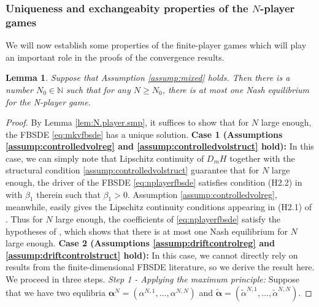 \documentclass[11pt,reqno]{amsart}
\numberwithin{equation}{section}
\newtheorem{lemma}[theorem]{Lemma}
\theoremstyle{definition}
\def\N{{\mathbb N}}
\newcommand{\wt}{\widetilde}
\def \N{\mathbb{N}}
\begin{document}
\subsubsection{Uniqueness and exchangeabity properties of the $N$-player games}


We will now establish some properties of the finite-player games which will play an important role in the proofs of the convergence results.




\begin{lemma} \label{lem:uniqueness}
Suppose that Assumption \ref{assump:mixed} holds.
Then there is a number $N_0 \in \N$ such that for any $N \geq N_0$, there is at most one Nash equilibrium for the N-player game.
\end{lemma}


\begin{proof}
 By Lemma \ref{lem:N.player.smp}, it suffices to show that for $N$ large enough, the FBSDE \eqref{eq:mkvfbsde} has a unique solution.
 \newline \newline \noindent
  \textbf{Case 1 (Assumptions \ref{assump:controlledvolreg} and \ref{assump:controlledvolstruct} hold):} In this case, we can simply note that Lipschitz continuity of $D_m H$ together with the structural condition \eqref{assump:controlledvolstruct} guarantee that for $N$ large enough, the driver of the FBSDE \eqref{eq:nplayerfbsde} satisfies condition (H2.2) in \cite{pengwumonotone} with $\beta_1$ therein such that $\beta_1 > 0$. 
  Assumption \ref{assump:controlledvolreg}, meanwhile, easily gives the Lipschitz continuity conditions appearing in (H2.1) of \cite{pengwumonotone}. Thus for $N$ large enough, the coefficients of \eqref{eq:nplayerfbsde} satisfy the hypotheses of \cite[Theorem 2.2]{pengwumonotone}, which shows that there is at most one Nash equilibrium for $N$ large enough.
  \newline \newline \noindent
   \textbf{Case 2 (Assumptions \ref{assump:driftcontrolreg} and \ref{assump:driftcontrolstruct} hold):} In this case, we cannot directly rely on results from the finite-dimensional FBSDE literature, so we derive the result here. We proceed in three steps.
   \newline  \noindent  
   \textit{Step 1 - Applying the maximum principle:}
  Suppose that we have two equlibria $\bm \alpha^N = (\alpha^{N,1},\dots,\alpha^{N,N})$ and $\bm{\wt{\alpha}} = (\wt{\alpha}^{N,1},\dots,\wt{\alpha}^{N,N})$. 

\end{proof}
\end{document}
